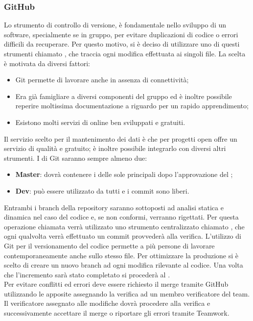 \documentclass[../NormeDiProgetto.tex]{subfiles}
\begin{document}
\subsubsection{GitHub}
Lo strumento di controllo di versione, è fondamentale nello sviluppo di un software, specialmente se in gruppo, per evitare duplicazioni di codice o errori difficili da recuperare.
Per questo motivo, si è deciso di utilizzare uno di questi strumenti chiamato , che traccia ogni modifica effettuata ai singoli file. La scelta è motivata da diversi fattori:
\begin{itemize}
\item Git permette di lavorare anche in assenza di connettività;
\item Era già famigliare a diversi componenti del gruppo ed è inoltre possibile reperire moltissima documentazione a riguardo per un rapido apprendimento;
\item Esistono molti servizi di  online ben sviluppati e gratuiti.
\end{itemize}
Il servizio scelto per il mantenimento dei dati è  che per progetti open  offre un servizio di qualità e gratuito; è inoltre possibile integrarlo con diversi altri strumenti.
I  di Git saranno sempre almeno due:
\begin{itemize}
\item \textbf{Master}: dovrà contenere i  delle sole  principali dopo l'approvazione del \responsabilediprogetto;
\item \textbf{Dev}: può essere utilizzato da tutti e i commit sono liberi.
\end{itemize}
Entrambi i branch della repository saranno sottoposti ad analisi statica e dinamica nel caso del codice e, se non conformi, verranno rigettati.
Per questa operazione chiamata  verrà utilizzato uno strumento centralizzato chiamato , che ogni qualvolta verrà effettuato un commit provvederà alla verifica.
L'utilizzo di Git per il versionamento del codice permette a più persone di lavorare contemporaneamente anche sullo stesso file. Per ottimizzare la produzione si è scelto di creare un nuovo branch ad ogni modifica rilevante al  codice. Una volta che l'incremento sarà stato completato si procederà al . \\
Per evitare conflitti ed errori deve essere richiesto il merge tramite GitHub utilizzando le apposite  assegnando la verifica ad un membro verificatore del team. Il verificatore assegnato alle modifiche dovrà procedere alla verifica e successivamente accettare il merge o riportare gli errori tramite Teamwork.
\end{document}
